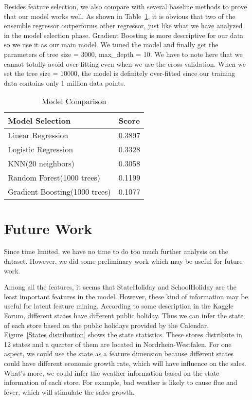 \documentclass[jou,apacite]{apa6}
\begin{document}
Besides feature selection, we also compare with several baseline methods to prove that our model works well. As shown in Table~\ref{models}, it is obvious that two of the ensemble regressor outperforms other regressor, just like what we have analyzed in the model selection phase. Gradient Boosting is more descriptive for our data so we use it as our main model. We tuned the model and finally get the parameters of tree size = 3000, max\_depth = 10. We have to note here that we cannot totally avoid over-fitting even when we use the cross validation. When we set the tree size = 10000, the model is definitely over-fitted since our training data contains only 1 million data points.

  \begin{table}
  \caption{Model Comparison} 
  \begin{tabular}{|l|l|}
  \hline
   Model Selection & Score \\
  \hline
   Linear Regression& 0.3897 \\
  \hline
   Logistic Regression & 0.3328 \\
  \hline
   KNN(20 neighbors) & 0.3058 \\
  \hline
   Random Forest(1000 trees) & 0.1199 \\
  \hline
   Gradient Boosting(1000 trees) & 0.1077 \\
  \hline
  \end{tabular}
  \label{models}  
  \end{table}


\section{Future Work}
Since time limited, we have no time to do too much further analysis on the dataset. However, we did some preliminary work which may be useful for future work.
    
Among all the features, it seems that StateHoliday and SchoolHoliday are the least important features in the model. However, these kind of information may be useful for latent feature mining. According to some description in the Kaggle Forum, different states have different public holiday. Thus we can infer the state of each store based on the public holidays provided by the Calendar.
Figure~\ref{States distribution} shows the state statistics. These stores distribute in 12 states and a quarter of them are located in Nordrhein-Westfalen. For one aspect, we could use the state as a feature dimension because different states could have different economic growth rate, which will have influence on the sales. What's more, we could infer the weather information based on the state information of each store. For example, bad weather is likely to cause flue and fever, which will stimulate the sales growth. 
 
\end{document}

